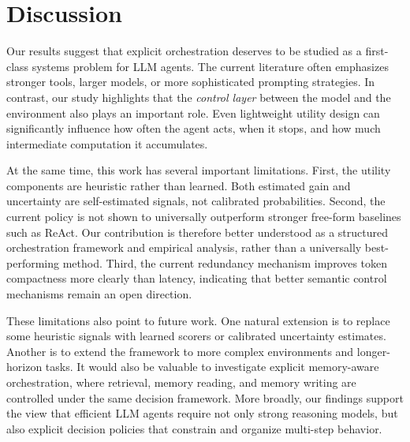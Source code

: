 \section{Discussion}

Our results suggest that explicit orchestration deserves to be studied as a first-class systems problem for LLM agents. The current literature often emphasizes stronger tools, larger models, or more sophisticated prompting strategies. In contrast, our study highlights that the \emph{control layer} between the model and the environment also plays an important role. Even lightweight utility design can significantly influence how often the agent acts, when it stops, and how much intermediate computation it accumulates.

At the same time, this work has several important limitations. First, the utility components are heuristic rather than learned. Both estimated gain and uncertainty are self-estimated signals, not calibrated probabilities. Second, the current policy is not shown to universally outperform stronger free-form baselines such as ReAct. Our contribution is therefore better understood as a structured orchestration framework and empirical analysis, rather than a universally best-performing method. Third, the current redundancy mechanism improves token compactness more clearly than latency, indicating that better semantic control mechanisms remain an open direction.

These limitations also point to future work. One natural extension is to replace some heuristic signals with learned scorers or calibrated uncertainty estimates. Another is to extend the framework to more complex environments and longer-horizon tasks. It would also be valuable to investigate explicit memory-aware orchestration, where retrieval, memory reading, and memory writing are controlled under the same decision framework. More broadly, our findings support the view that efficient LLM agents require not only strong reasoning models, but also explicit decision policies that constrain and organize multi-step behavior.